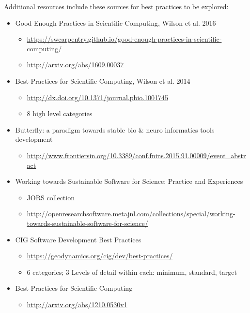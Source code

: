 \noindent
Additional resources include these sources for best practices to be explored: 

\begin{itemize}
\item Good Enough Practices in Scientific Computing, Wilson et al. 2016

\begin{itemize}
\item \url{https://swcarpentry.github.io/good-enough-practices-in-scientific-computing/}
\item \url{http://arxiv.org/abs/1609.00037}
\end{itemize}

\item Best Practices for Scientific Computing, Wilson et al. 2014
\begin{itemize}
\item \url{http://dx.doi.org/10.1371/journal.pbio.1001745}
\item 8 high level categories 
\end{itemize}

\item Butterfly: a paradigm towards stable bio & neuro informatics tools development
\begin{itemize}
\item \url{http://www.frontiersin.org/10.3389/conf.fnins.2015.91.00009/event_abstract}
\end{itemize}

\item Working towards Sustainable Software for Science: Practice and Experiences
\begin{itemize}
\item JORS collection
\item \url{http://openresearchsoftware.metajnl.com/collections/special/working-towards-sustainable-software-for-science/}
\end{itemize}

\item CIG Software Development Best Practices
\begin{itemize}
\item \url{https://geodynamics.org/cig/dev/best-practices/}
\item 6 categories; 3 Levels of detail within each: minimum, standard, target
\end{itemize}

\item Best Practices for Scientific Computing
\begin{itemize}
\item \url{http://arxiv.org/abs/1210.0530v1}
\end{itemize}


\end{itemize}
